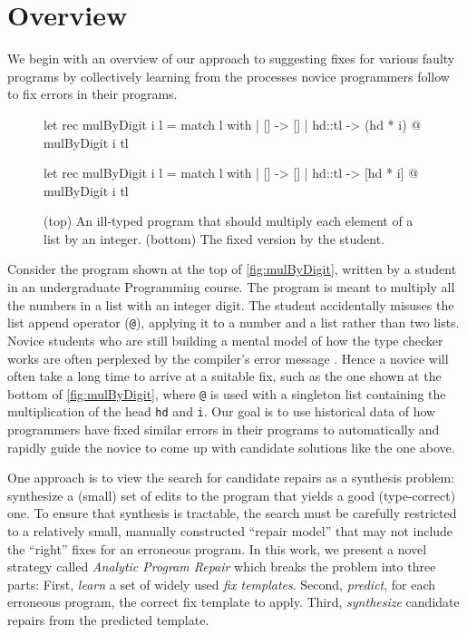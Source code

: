 \section{Overview}
\label{sec:overview}

We begin with an overview of our approach to suggesting fixes for various faulty
programs by collectively learning from the processes novice programmers follow
to fix errors in their programs.

\begin{figure}[ht]
\begin{ecode}
let rec mulByDigit i l =
  match l with
  | []     -> []
  | hd::tl -> (hd * i) @ mulByDigit i tl
\end{ecode}

\begin{ecode}
let rec mulByDigit i l =
  match l with
  | []     -> []
  | hd::tl -> [hd * i] @ mulByDigit i tl
\end{ecode}
\caption{(top) An ill-typed \ocaml program that should multiply each element
of a list by an integer. (bottom) The fixed version by the student.}
\label{fig:mulByDigit}
\end{figure}


 Consider the program \mbd shown at the top of
\autoref{fig:mulByDigit}, written by a student in an undergraduate Programming
course. The program is meant to multiply all the numbers in a list with an
integer digit. The student accidentally misuses the list append operator
(\texttt{@}), applying it to a number and a list rather than two lists.
%
Novice students who are still building a mental model of how the type checker
works are often perplexed by the compiler's error message \citep{Munson_2016}.
Hence a novice will often take a long time to arrive at a suitable fix, such as
the one shown at the bottom of \autoref{fig:mulByDigit}, where \texttt{@} is
used with a singleton list containing the multiplication of the head \texttt{hd}
and \texttt{i}.
%
Our goal is to use historical data of how programmers have fixed similar errors
in their programs to automatically and rapidly guide the novice to come up with
candidate solutions like the one above.


%
One approach is to view the search for candidate repairs
as a synthesis problem: synthesize a (small) set of edits
to the program that yields a good (\eg type-correct) one.
%
To ensure that synthesis is tractable, the search must be
carefully restricted to a relatively small, manually constructed
``repair model'' that may not include the ``right'' fixes for
an erroneous program.
%
In this work, we present a novel strategy called
\emph{Analytic Program Repair} which breaks the
problem into three parts:
%
First, \emph{learn} a set of widely used \emph{fix templates}.
%
Second, \emph{predict}, for each erroneous program, the correct fix template to apply.
%
Third, \emph{synthesize} candidate repairs from the predicted template.

